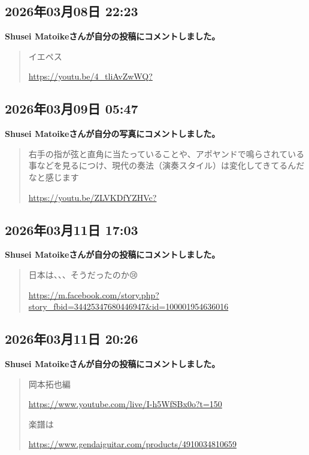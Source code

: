 \subsection*{2026年03月08日 22:23}

\textbf{Shusei Matoikeさんが自分の投稿にコメントしました。}

\begin{quote}
イエペス

\url{https://youtu.be/4_tliAvZwWQ?}
\end{quote}

\subsection*{2026年03月09日 05:47}

\textbf{Shusei Matoikeさんが自分の写真にコメントしました。}

\begin{quote}
右手の指が弦と直角に当たっていることや、アポヤンドで鳴らされている事などを見るにつけ、現代の奏法（演奏スタイル）は変化してきてるんだなと感じます

\url{https://youtu.be/ZLVKDfYZHVc?}
\end{quote}

\subsection*{2026年03月11日 17:03}

\textbf{Shusei Matoikeさんが自分の投稿にコメントしました。}

\begin{quote}
日本は、、、そうだったのか😢

\url{https://m.facebook.com/story.php?story_fbid=34425347680446947&id=100001954636016}
\end{quote}

\subsection*{2026年03月11日 20:26}

\textbf{Shusei Matoikeさんが自分の投稿にコメントしました。}

\begin{quote}
岡本拓也編

\url{https://www.youtube.com/live/I-h5WfSBx0o?t=150}

楽譜は

\url{https://www.gendaiguitar.com/products/4910034810659}
\end{quote}

